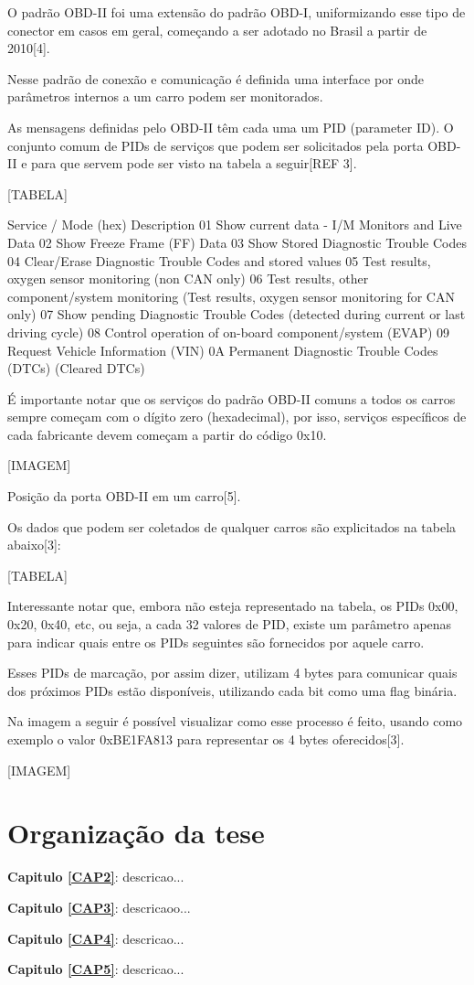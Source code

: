 O padrão OBD-II foi uma extensão do padrão OBD-I, uniformizando esse tipo de conector em casos em geral, começando a ser adotado no Brasil a partir de 2010[4].

Nesse padrão de conexão e comunicação é definida uma interface por onde parâmetros internos a um carro podem ser monitorados.

As mensagens definidas pelo OBD-II têm cada uma um PID (parameter ID). O conjunto comum de PIDs de serviços que podem ser solicitados pela porta OBD-II e para que servem pode ser visto na tabela a seguir[REF 3].

[TABELA]

Service / Mode (hex)
Description
01
Show current data - I/M Monitors and Live Data
02
Show Freeze Frame (FF) Data
03
Show Stored Diagnostic Trouble Codes
04
Clear/Erase Diagnostic Trouble Codes and stored values
05
Test results, oxygen sensor monitoring (non CAN only)
06
Test results, other component/system monitoring (Test results, oxygen sensor monitoring for CAN only)
07
Show pending Diagnostic Trouble Codes (detected during current or last driving cycle)
08
Control operation of on-board component/system (EVAP)
09
Request Vehicle Information (VIN)
0A
Permanent Diagnostic Trouble Codes (DTCs) (Cleared DTCs)

É importante notar que os serviços do padrão OBD-II comuns a todos os carros sempre começam com o dígito zero (hexadecimal), por isso, serviços específicos de cada fabricante devem começam a partir do código 0x10.

[IMAGEM]

Posição da porta OBD-II em um carro[5].

Os dados que podem ser coletados de qualquer carros são explicitados na tabela abaixo[3]:

[TABELA]

Interessante notar que, embora não esteja representado na tabela, os PIDs 0x00, 0x20, 0x40, etc, ou seja, a cada 32 valores de PID, existe um parâmetro apenas para indicar quais entre os PIDs seguintes são fornecidos por aquele carro.

Esses PIDs de marcação, por assim dizer, utilizam 4 bytes para comunicar quais dos próximos PIDs estão disponíveis, utilizando cada bit como uma flag binária. 

Na imagem a seguir é possível visualizar como esse processo é feito, usando como exemplo o valor 0xBE1FA813 para representar os 4 bytes oferecidos[3].

[IMAGEM]


\section{Organização da tese}

\noindent \textbf{Capitulo \ref{CAP2}}: descricao...

\noindent \textbf{Capitulo \ref{CAP3}}: descricaoo...

\noindent \textbf{Capitulo \ref{CAP4}}: descricao...

\noindent \textbf{Capitulo \ref{CAP5}}: descricao...